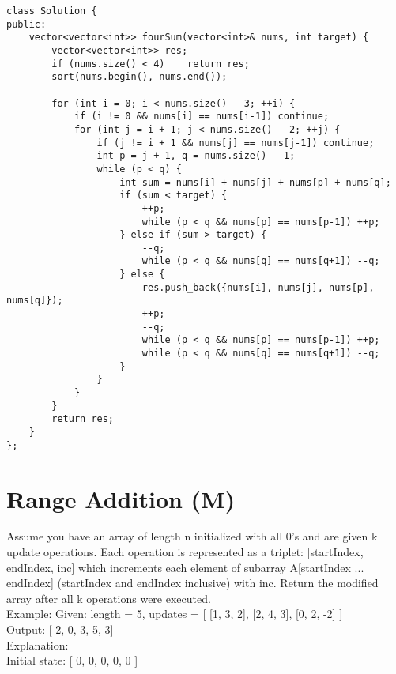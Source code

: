 \begin{lstlisting}
class Solution {
public:
    vector<vector<int>> fourSum(vector<int>& nums, int target) {
        vector<vector<int>> res;
        if (nums.size() < 4)    return res;  
        sort(nums.begin(), nums.end());
        
        for (int i = 0; i < nums.size() - 3; ++i) {
            if (i != 0 && nums[i] == nums[i-1]) continue;
            for (int j = i + 1; j < nums.size() - 2; ++j) {
                if (j != i + 1 && nums[j] == nums[j-1]) continue;
                int p = j + 1, q = nums.size() - 1;
                while (p < q) {
                    int sum = nums[i] + nums[j] + nums[p] + nums[q];
                    if (sum < target) {
                        ++p;
                        while (p < q && nums[p] == nums[p-1]) ++p;
                    } else if (sum > target) {
                        --q;
                        while (p < q && nums[q] == nums[q+1]) --q;
                    } else {
                        res.push_back({nums[i], nums[j], nums[p], nums[q]});
                        ++p;
                        --q;
                        while (p < q && nums[p] == nums[p-1]) ++p;
                        while (p < q && nums[q] == nums[q+1]) --q;
                    }
                }
            }
        }
        return res;
    }
};
\end{lstlisting}


\section{Range Addition (M)}
Assume you have an array of length n initialized with all 0's and are given k update operations. Each operation is represented as a triplet: [startIndex, endIndex, inc] which increments each element of subarray A[startIndex ... endIndex] (startIndex and endIndex inclusive) with inc. Return the modified array after all k operations were executed.\\

Example:
Given:
    length = 5,
    updates = [
        [1,  3,  2],
        [2,  4,  3],
        [0,  2, -2]
    ]\\

Output:
    [-2, 0, 3, 5, 3]\\

Explanation:\\

Initial state:
[ 0, 0, 0, 0, 0 ]\\

